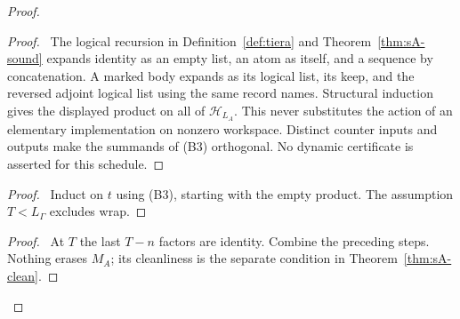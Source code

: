 \begin{proof}
 \begin{proof}\pf\ The logical recursion in Definition~\ref{def:tiera}
 and Theorem~\ref{thm:sA-sound} expands identity as an empty list, an
 atom as itself, and a sequence by concatenation. A marked body expands
 as its logical list, its keep, and the reversed adjoint logical list
 using the same record names. Structural induction gives the displayed
 product on all of $\mathcal H_{L_A}$. This never substitutes the
 action of an elementary implementation on nonzero workspace.
 Distinct counter inputs and outputs make the summands of (B3)
 orthogonal. No dynamic certificate is asserted for this schedule.
 \end{proof}
 \begin{proof}\pf\ Induct on $t$ using (B3), starting with the empty
 product. The assumption $T<L_{\Gamma}$ excludes wrap.\end{proof}
 \qedstep
 \begin{proof}\pf\ At $T$ the last $T-n$ factors are identity.
 Combine the preceding steps. Nothing erases $M_A$; its cleanliness is
 the separate condition in Theorem~\ref{thm:sA-clean}.\end{proof}
\end{proof}

